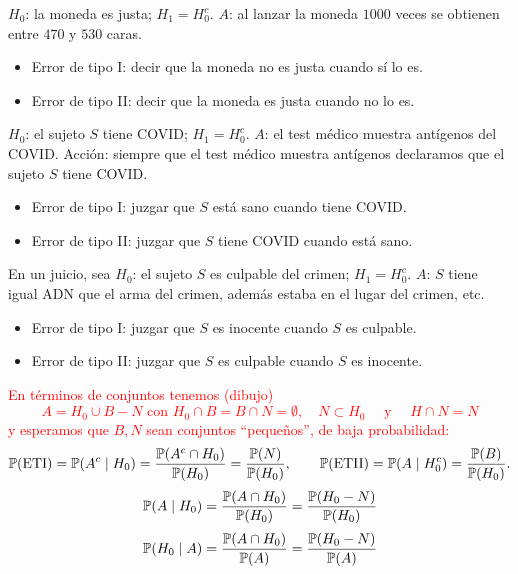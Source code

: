 \begin{ejemplo}[29]
$H_0$: la moneda es justa; $H_1 = H_0^c$. $A$: al lanzar la moneda $1000$ veces se obtienen entre $470$ y $530$ caras.
\begin{itemize}
  \item Error de tipo I: decir que la moneda no es justa cuando sí lo es.
  \item Error de tipo II: decir que la moneda es justa cuando no lo es.
\end{itemize}
\end{ejemplo}
\textcolor{azulresalt}{
\begin{ejemplo}[30]
$H_0$: el sujeto $S$ tiene COVID; $H_1 = H_0^c$. $A$: el test médico muestra antígenos del COVID. Acción: siempre que el test médico muestra antígenos declaramos que el sujeto $S$ tiene COVID.
\begin{itemize}
  \item Error de tipo I: juzgar que $S$ está sano cuando tiene COVID.
  \item Error de tipo II: juzgar que $S$ tiene COVID cuando está sano.
\end{itemize}
\end{ejemplo}
\begin{ejemplo}[31]
En un juicio, sea $H_0$: el sujeto $S$ es culpable del crimen; $H_1 = H_0^c$. $A$: $S$ tiene igual ADN que el arma del crimen, además estaba en el lugar del crimen, etc.
\begin{itemize}
  \item Error de tipo I: juzgar que $S$ es inocente cuando $S$ es culpable.
  \item Error de tipo II: juzgar que $S$ es culpable cuando $S$ es inocente.
\end{itemize}\end{ejemplo}}\textcolor{red}{
En términos de conjuntos tenemos (dibujo) 
$$A = H_0 \cup B- N \text{ con } H_0 \cap B = B \cap N= \emptyset, \quad  N \subset H_0\quad  \text{ y } \quad H \cap N =N $$
y esperamos que $B,N$ sean conjuntos ``peque\~nos'', de baja probabilidad:
\[
  \mathbb{P}(\text{ETI}) = \mathbb{P}(A^c \mid H_0) = \frac{\mathbb{P}(A^c \cap H_0)}{\mathbb{P}(H_0)} = \frac{\mathbb{P}(N)}{\mathbb{P}(H_0)}, \qquad
  \mathbb{P}(\text{ETII}) = \mathbb{P}(A \mid H_0^c) = \frac{\mathbb{P}(B)}{\mathbb{P}(H_0)}.
\]
\[
\mathbb{P}(A \mid H_0) = \frac{\mathbb{P}(A\cap H_0)} {\mathbb{P} (H_0)} = \frac{\mathbb{P}(H_0-N)}{\mathbb{P} (H_0)}
\]
\[
\mathbb{P}(H_0 \mid A) = \frac{\mathbb{P}(A\cap H_0)} {\mathbb{P} (A)} = \frac{\mathbb{P}(H_0-N)}{\mathbb{P} (A)}
\]}\begin{figure}[htbp]
  \centering
\end{figure}
